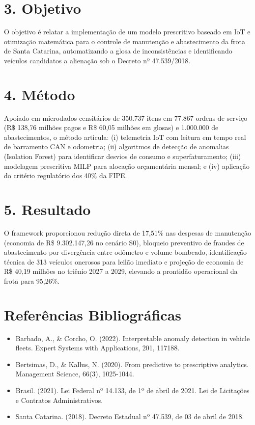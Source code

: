 \documentclass[10pt,a4paper,journal]{article}
\begin{document}
\section{3. Objetivo}
O objetivo é relatar a implementação de um modelo prescritivo baseado em IoT e otimização matemática para o controle de manutenção e abastecimento da frota de Santa Catarina, automatizando a glosa de inconsistências e identificando veículos candidatos a alienação sob o Decreto nº 47.539/2018.

\section{4. Método}
Apoiado em microdados censitários de 350.737 itens em 77.867 ordens de serviço (R\$ 138,76 milhões pagos e R\$ 60,05 milhões em glosas) e 1.000.000 de abastecimentos, o método articula: (i) telemetria IoT com leitura em tempo real de barramento CAN e odometria; (ii) algoritmos de detecção de anomalias (Isolation Forest) para identificar desvios de consumo e superfaturamento; (iii) modelagem prescritiva MILP para alocação orçamentária mensal; e (iv) aplicação do critério regulatório dos 40\% da FIPE.

\section{5. Resultado}
O framework proporcionou redução direta de 17,51\% nas despesas de manutenção (economia de R\$ 9.302.147,26 no cenário S0), bloqueio preventivo de fraudes de abastecimento por divergência entre odômetro e volume bombeado, identificação técnica de 313 veículos onerosos para leilão imediato e projeção de economia de R\$ 40,19 milhões no triênio 2027 a 2029, elevando a prontidão operacional da frota para 95,26\%.

\section{Referências Bibliográficas}
\begin{itemize}
\item Barbado, A., \& Corcho, O. (2022). Interpretable anomaly detection in vehicle fleets. Expert Systems with Applications, 201, 117188.
\end{itemize}
\begin{itemize}
\item Bertsimas, D., \& Kallus, N. (2020). From predictive to prescriptive analytics. Management Science, 66(3), 1025-1044.
\end{itemize}
\begin{itemize}
\item Brasil. (2021). Lei Federal nº 14.133, de 1º de abril de 2021. Lei de Licitações e Contratos Administrativos.
\end{itemize}
\begin{itemize}
\item Santa Catarina. (2018). Decreto Estadual nº 47.539, de 03 de abril de 2018.
\end{itemize}
\end{document}
